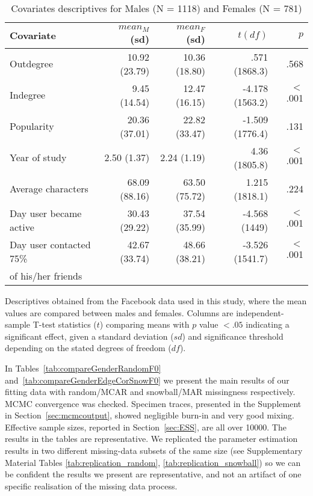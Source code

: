 \documentclass{article}
\begin{document}
\begin{table}[ht]
	\centering
	\caption{Covariates descriptives for Males (N = 1118) and Females (N = 781)}
	\label{tab:FacebookDescriptives}
	\begin{tabular}{lrrrr}
		Covariate 				& $mean_M$ (sd) & $mean_F$ (sd) & $t (df)$ 		& $p$ 	\\ \hline
		Outdegree  				& 10.92 (23.79)	& 10.36 (18.80) &  .571 (1868.3)& .568	\\
		Indegree  				&  9.45 (14.54) & 12.47 (16.15)	&-4.178 (1563.2)&$<$.001\\
		Popularity 				& 20.36 (37.01)	& 22.82 (33.47)	&-1.509 (1776.4)& .131 	\\
		Year of study			&  2.50 (1.37) 	&  2.24 (1.19) 	& 4.36 (1805.8) &$<$.001\\
		Average characters		& 68.09 (88.16)	& 63.50 (75.72)	& 1.215 (1818.1)& .224 	\\
		Day user became active	& 30.43 (29.22)	& 37.54 (35.99)	&-4.568 (1449)  &$<$.001\\
		Day user contacted 75\% & 42.67 (33.74)	& 48.66 (38.21)	&-3.526 (1541.7)&$<$.001\\
		of his/her friends		&				&				&				& 		\\ \hline
		
	\end{tabular}
	\raggedright Descriptives obtained from the Facebook data used in this study, where the mean values are compared between males and females. Columns are independent-sample T-test statistics ($t$) comparing means with $p$ value $<.05$ indicating a significant effect, given a standard deviation ($sd$) and significance threshold depending on the stated degrees of freedom ($df$).
\end{table}

In Tables~\ref{tab:compareGenderRandomF0} and~\ref{tab:compareGenderEdgeCorSnowF0} we present the main results of our fitting data with random/MCAR and snowball/MAR missingness
respectively. MCMC convergence was checked. Specimen traces, presented in the Supplement in Section~\ref{sec:mcmcoutput}, showed negligible burn-in and very good mixing. 
Effective sample sizes, reported in Section~\ref{sec:ESS}, are all over 10000. The results in the tables are representative. We replicated the parameter estimation results 
in two different missing-data subsets of the same size (see Supplementary Material Tables \ref{tab:replication_random}, \ref{tab:replication_snowball}) so we can be confident the results we present are representative, and not an artifact of one specific realisation of the missing data process.
\end{document}
